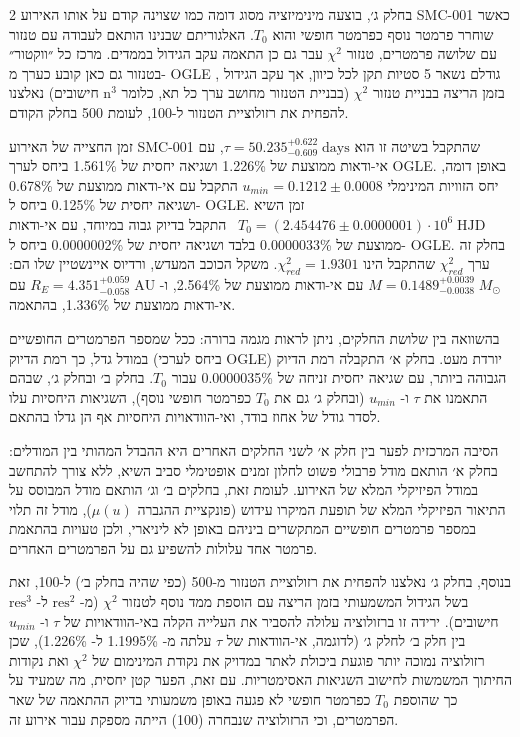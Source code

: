 \documentclass{article}
\begin{document}
\begin{multicols}{2}
\vspace{0.25cm}
\noindent
בחלק ג׳, בוצעה מינימיזציה מסוג דומה כמו שצוינה קודם על אותו האירוע 
\mbox{\textenglish{SMC-001}}
כאשר שוחרר פרמטר נוסף כפרמטר חופשי והוא 
$T_0$. 
האלגוריתם שבנינו הותאם לעבודה עם טנזור עם שלושה פרמטרים,
טנזור 
$\chi^2$
עבר גם כן התאמה עקב הגידול בממדים.
מרכז כל ״ווקטור״ בטנזור גם כאן קובע כערך מ-
\textenglish{OGLE}
, גודלם נשאר 5 סטיות תקן לכל כיוון,
אך עקב הגידול בזמן הריצה בבניית טנזור 
$\chi^2$
(בבניית הטנזור מחושב ערך כל תא, כלומר 
$\text{n}^3$
חישובים)
נאלצנו להפחית את רזולוציית הטנזור ל-100, לעומת 500
בחלק הקודם.

זמן החצייה של האירוע
\mbox{\textenglish{SMC-001}}
שהתקבל בשיטה זו הוא
\mbox{$\tau = 50.235^{+0.622}_{-0.609} \;\text{days}$},
עם אי-ודאות ממוצעת של
\mbox{1.226\%}
ושגיאה יחסית של
\mbox{1.561\%}
ביחס לערך
\textenglish{OGLE}.
באופן דומה, יחס הזוויות המינימלי
\mbox{$u_{min} = 0.1212 \pm 0.0008 $}
התקבל עם אי-ודאות ממוצעת של
\mbox{0.678\%}
ושגיאה יחסית של
\mbox{0.125\%}
ביחס ל-
\textenglish{OGLE}.
זמן השיא
\mbox{$T_0 = (2.454476 \pm 0.0000001)\cdot 10^{6}\;\text{HJD}$ }
התקבל בדיוק גבוה במיוחד, עם אי-ודאות ממוצעת של
\mbox{0.0000033\%}
בלבד ושגיאה יחסית של
\mbox{0.0000002\%}
ביחס ל-
\textenglish{OGLE}.
בחלק זה ערך $\chi^2_{red}$
שהתקבל הינו
$\chi^2_{red}=1.9301$.
משקל הכוכב המעדש, ורדיוס איינשטיין שלו הם:
\mbox{$M=0.1489^{+0.0039}_{-0.0038} \;M_{\odot}$}
עם אי-ודאות ממוצעת של
\mbox{2.564\%},
ו-
\mbox{$R_E=4.351^{+0.059}_{-0.058}\;\text{AU}$}
עם אי-ודאות ממוצעת של
\mbox{1.336\%},
בהתאמה.

\vspace{0.25cm}
\noindent
בהשוואה בין שלושת החלקים, ניתן לראות מגמה ברורה:
ככל שמספר הפרמטרים החופשיים במודל גדל,
כך רמת הדיוק (ביחס לערכי
\textenglish{OGLE})
יורדת מעט.
בחלק א׳ התקבלה רמת הדיוק הגבוהה ביותר, עם שגיאה יחסית זניחה של
\mbox{0.0000035\%}
עבור
$T_0$.
בחלק ב׳ ובחלק ג׳, שבהם התאמנו את
$\tau$
ו-
$u_{min}$
(ובחלק ג׳ גם את
$T_0$
כפרמטר חופשי נוסף),
השגיאות היחסיות עלו לסדר גודל של אחוז בודד,
ואי-הוודאויות היחסיות אף הן גדלו בהתאם.

הסיבה המרכזית לפער בין חלק א׳ לשני החלקים האחרים היא ההבדל המהותי בין המודלים:
בחלק א׳ הותאם מודל פרבולי פשוט לחלון זמנים אופטימלי סביב השיא,
ללא צורך להתחשב במודל הפיזיקלי המלא של האירוע.
לעומת זאת, בחלקים ב׳ וג׳ הותאם מודל המבוסס על התיאור הפיזיקלי המלא של תופעת המיקרו עידוש
(פונקציית ההגברה
$\mu(u)$),
מודל זה תלוי במספר פרמטרים חופשיים המתקשרים ביניהם באופן לא ליניארי,
ולכן טעויות בהתאמת פרמטר אחד עלולות להשפיע גם על הפרמטרים האחרים.

בנוסף, בחלק ג׳ נאלצנו להפחית את רזולוציית הטנזור מ-500 (כפי שהיה בחלק ב׳) ל-100,
זאת בשל הגידול המשמעותי בזמן הריצה עם הוספת ממד נוסף לטנזור
$\chi^2$
(מ-
$\text{res}^2$
ל-
$\text{res}^3$
חישובים).
ירידה זו ברזולוציה עלולה להסביר את העלייה הקלה באי-הוודאויות של
$\tau$
ו-
$u_{min}$
בין חלק ב׳ לחלק ג׳
(לדוגמה, אי-הוודאות של
$\tau$
עלתה מ-
\mbox{1.1995\%}
ל-
\mbox{1.226\%}),
שכן רזולוציה נמוכה יותר פוגעת ביכולת לאתר במדויק את נקודת המינימום של
$\chi^2$
ואת נקודות החיתוך המשמשות לחישוב השגיאות האסימטריות.
עם זאת, הפער קטן יחסית, מה שמעיד על כך שהוספת
$T_0$
כפרמטר חופשי לא פגעה באופן משמעותי בדיוק ההתאמה של שאר הפרמטרים,
וכי הרזולוציה שנבחרה (100) הייתה מספקת עבור אירוע זה.


\end{multicols}
\end{document}
